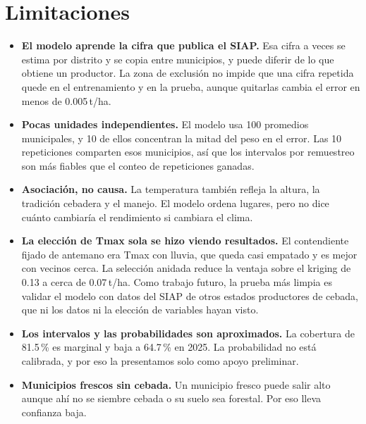\section{Limitaciones}\label{sec:discusion}

\begin{itemize}
\item \textbf{El modelo aprende la cifra que publica el SIAP.} Esa cifra a veces se estima por distrito y se copia
entre municipios, y puede diferir de lo que obtiene un productor. La zona de exclusión no impide que una cifra
repetida quede en el entrenamiento y en la prueba, aunque quitarlas cambia el error en menos de 0.005\,t/ha.
\item \textbf{Pocas unidades independientes.} El modelo usa 100 promedios municipales, y 10 de ellos concentran la
mitad del peso en el error. Las 10 repeticiones comparten esos municipios, así que los intervalos por remuestreo
son más fiables que el conteo de repeticiones ganadas.
\item \textbf{Asociación, no causa.} La temperatura también refleja la altura, la tradición cebadera y el manejo. El
modelo ordena lugares, pero no dice cuánto cambiaría el rendimiento si cambiara el clima.
\item \textbf{La elección de Tmax sola se hizo viendo resultados.} El contendiente fijado de antemano era Tmax con
lluvia, que queda casi empatado y es mejor con vecinos cerca. La selección anidada reduce la ventaja sobre el
kriging de 0.13 a cerca de 0.07\,t/ha. Como trabajo futuro, la prueba más limpia es validar el modelo con datos del
SIAP de otros estados productores de cebada, que ni los datos ni la elección de variables hayan visto.
\item \textbf{Los intervalos y las probabilidades son aproximados.} La cobertura de 81.5\,\% es marginal y baja a
64.7\,\% en 2025. La probabilidad no está calibrada, y por eso la presentamos solo como apoyo preliminar.
\item \textbf{Municipios frescos sin cebada.} Un municipio fresco puede salir alto aunque ahí no se siembre cebada o
su suelo sea forestal. Por eso lleva confianza baja.
\end{itemize}
